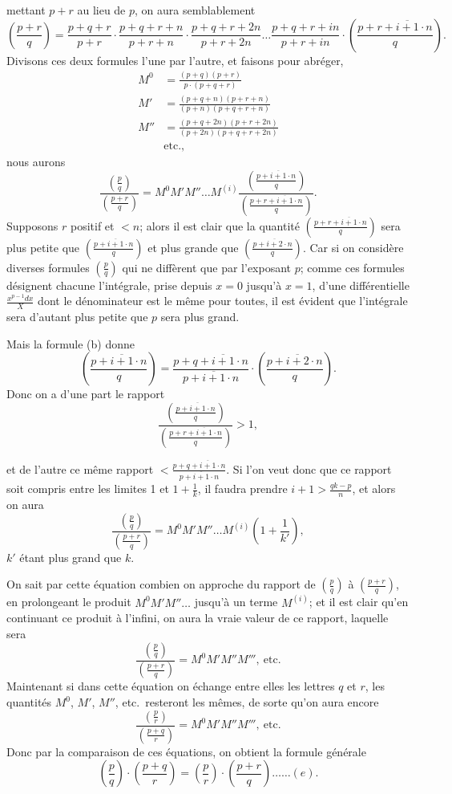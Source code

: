 \documentclass{article}
\begin{document}
mettant $p+r$ au lieu de $p$, on aura semblablement
\[ \left(\frac{p+r}{q}\right)=\frac{p+q+r}{p+r}\cdot\frac{p+q+r+n}{p+r+n}\cdot\frac{p+q+r+2n}{p+r+2n}\ldots\frac{p+q+r+in}{p+r+in}\cdot\left(\frac{p+r+\overline{i+1}\cdot n}{q}\right). \]
Divisons ces deux formules l'une par l'autre, et faisons pour abréger,
\[ \begin{aligned} M^{0}&=\frac{(p+q)(p+r)}{p\cdot(p+q+r)}\\ M'&=\frac{(p+q+n)(p+r+n)}{(p+n)(p+q+r+n)}\\ M''&=\frac{(p+q+2n)(p+r+2n)}{(p+2n)(p+q+r+2n)}\\ &\text{etc.}, \end{aligned} \]
nous aurons
\[ \frac{\left(\frac{p}{q}\right)}{\left(\frac{p+r}{q}\right)}=M^{0}M'M''\ldots M^{(i)}\frac{\left(\frac{p+\overline{i+1}\cdot n}{q}\right)}{\left(\frac{p+r+\overline{i+1}\cdot n}{q}\right)}. \]
Supposons $r$ positif et $<n$; alors il est clair que la quantité $\left(\frac{p+r+\overline{i+1}\cdot n}{q}\right)$ sera plus petite que $\left(\frac{p+\overline{i+1}\cdot n}{q}\right)$ et plus grande que $\left(\frac{p+\overline{i+2}\cdot n}{q}\right)$. Car si on considère diverses formules $\left(\frac{p}{q}\right)$ qui ne diffèrent que par l'exposant $p$; comme ces formules désignent chacune l'intégrale, prise depuis $x=0$ jusqu'à $x=1$, d'une différentielle $\frac{x^{p-1}dx}{X}$ dont le dénominateur est le même pour toutes, il est évident que l'intégrale sera d'autant plus petite que $p$ sera plus grand.

Mais la formule (b) donne
\[ \left(\frac{p+\overline{i+1}\cdot n}{q}\right)=\frac{p+q+\overline{i+1}\cdot n}{p+\overline{i+1}\cdot n}\cdot\left(\frac{p+\overline{i+2}\cdot n}{q}\right). \]
Donc on a d'une part le rapport
\[ \frac{\left(\frac{p+\overline{i+1}\cdot n}{q}\right)}{\left(\frac{p+r+\overline{i+1}\cdot n}{q}\right)}>1, \]

et de l'autre ce même rapport $<\frac{p+q+\overline{i+1}\cdot n}{p+\overline{i+1}\cdot n}$. Si l'on veut donc que ce rapport soit compris entre les limites 1 et $1+\frac{1}{k}$, il faudra prendre $i+1>\frac{qk-p}{n}$, et alors on aura
\[ \frac{\left(\frac{p}{q}\right)}{\left(\frac{p+r}{q}\right)}=M^{0}M'M''\ldots M^{(i)}\left(1+\frac{1}{k'}\right), \]
$k'$ étant plus grand que $k$.

On sait par cette équation combien on approche du rapport de $\left(\frac{p}{q}\right)$ à $\left(\frac{p+r}{q}\right)$, en prolongeant le produit $M^{0}M'M''\ldots$ jusqu'à un terme $M^{(i)}$; et il est clair qu'en continuant ce produit à l'infini, on aura la vraie valeur de ce rapport, laquelle sera
\[ \frac{\left(\frac{p}{q}\right)}{\left(\frac{p+r}{q}\right)}=M^{0}M'M''M''',\ \text{etc.} \]
Maintenant si dans cette équation on échange entre elles les lettres $q$ et $r$, les quantités $M^{0}$, $M'$, $M''$, etc.\ resteront les mêmes, de sorte qu'on aura encore
\[ \frac{\left(\frac{p}{r}\right)}{\left(\frac{p+q}{r}\right)}=M^{0}M'M''M''',\ \text{etc.} \]
Donc par la comparaison de ces équations, on obtient la formule générale
\[ \left(\frac{p}{q}\right)\cdot\left(\frac{p+q}{r}\right)=\left(\frac{p}{r}\right)\cdot\left(\frac{p+r}{q}\right)\ldots\ldots(e). \]
\end{document}
